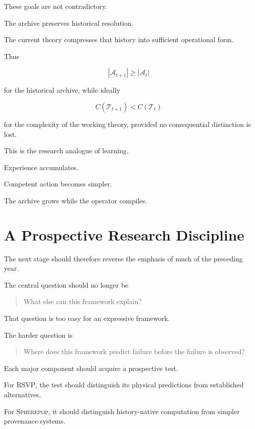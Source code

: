 \documentclass[11pt]{article}
\theoremstyle{remark}
\newcommand{\RSVP}{\textsc{RSVP}}
\newcommand{\Spherepop}{\textsc{Spherepop}}
\begin{document}
These goals are not contradictory.

The archive preserves historical resolution.

The current theory compresses that history into sufficient operational form.

Thus

\begin{equation}
|\mathcal{A}_{t+1}|
\geq
|\mathcal{A}_t|
\end{equation}

for the historical archive, while ideally

\begin{equation}
C(\mathcal{T}_{t+1})
<
C(\mathcal{T}_t)
\end{equation}

for the complexity of the working theory, provided no consequential distinction
is lost.

This is the research analogue of learning.

Experience accumulates.

Competent action becomes simpler.

The archive grows while the operator compiles.

\section{A Prospective Research Discipline}

The next stage should therefore reverse the emphasis of much of the preceding
year.

The central question should no longer be

\begin{quote}
What else can this framework explain?
\end{quote}

That question is too easy for an expressive framework.

The harder question is

\begin{quote}
Where does this framework predict failure before the failure is observed?
\end{quote}

Each major component should acquire a prospective test.

For \RSVP{}, the test should distinguish its physical predictions from
established alternatives.

For \Spherepop{}, it should distinguish history-native computation from simpler
provenance systems.
\end{document}
